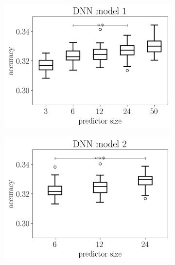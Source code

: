 
\begin{figure}[h] %
	\centering
	\begin{subfigure}[t]{0.48\linewidth}
		\includegraphics[width = \textwidth]{pics/dnn_model_1_all_runs_p1_ecoli_100000_10000_all_0.png}
		\label{fig:alpha}
	\end{subfigure}
	\begin{subfigure}[t]{0.48\linewidth}
		\includegraphics[width = \textwidth]{pics/dnn_model_2_all_runs_p1_ecoli_100000_10000_all_0.png}
			\label{fig:alpha}
	\end{subfigure}
	\begin{subfigure}[]{0.48\linewidth}

\end{subfigure}
\end{figure}
